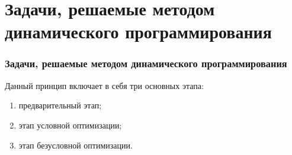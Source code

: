 \documentclass{spbseu}
\begin{document}
    \section{Задачи, решаемые методом динамического программирования}
    \begin{frame}
        \frametitle{Задачи, решаемые методом динамического программирования}
		\tableofcontents[part=3]
        \vskip15pt
        Данный принцип включает в себя три основных этапа:
        \begin{enumerate}
            \item предварительный этап;
            \item этап условной оптимизации;
            \item этап безусловной оптимизации.
        \end{enumerate}
    \end{frame}
\end{document}
